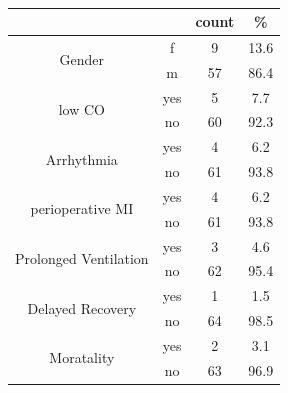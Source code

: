 \documentclass[14pt,a4paper,onecolumn]{extarticle}
\begin{document}
\begin{table}[]
\centering
\caption{}
\label{Result_Counts}
    \begin{tabular}{cccc}
    \hline
                                           &     & count & \%   \\ \hline
    \multirow{2}{*}{Gender}                & f   & 9     & 13.6 \\
                                           & m   & 57    & 86.4 \\
    \multirow{2}{*}{low CO}                & yes & 5     & 7.7  \\
                                           & no  & 60    & 92.3 \\
    \multirow{2}{*}{Arrhythmia}            & yes & 4     & 6.2  \\
                                           & no  & 61    & 93.8 \\
    \multirow{2}{*}{perioperative MI}      & yes & 4     & 6.2  \\
                                           & no  & 61    & 93.8 \\
    \multirow{2}{*}{Prolonged Ventilation} & yes & 3     & 4.6  \\
                                           & no  & 62    & 95.4 \\
    \multirow{2}{*}{Delayed Recovery}      & yes & 1     & 1.5  \\
                                           & no  & 64    & 98.5 \\
    \multirow{2}{*}{Moratality}            & yes & 2     & 3.1  \\ 
                                           & no  & 63    & 96.9 \\
    \end{tabular}
\end{table}
\end{document}
